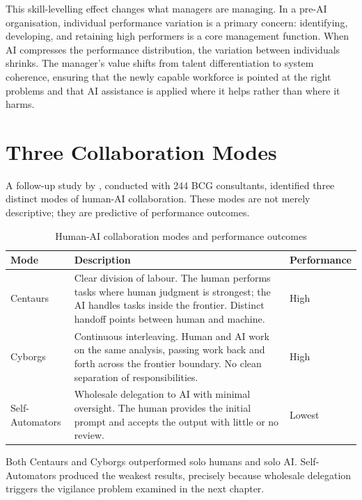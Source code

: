 This skill-levelling effect changes what managers are managing. In a pre-AI organisation, individual performance variation is a primary concern: identifying, developing, and retaining high performers is a core management function. When AI compresses the performance distribution, the variation between individuals shrinks. The manager's value shifts from talent differentiation to system coherence, ensuring that the newly capable workforce is pointed at the right problems and that AI assistance is applied where it helps rather than where it harms.

\section{Three Collaboration Modes}

A follow-up study by \textcite{Randazzo2024}, conducted with 244 BCG consultants, identified three distinct modes of human-AI collaboration. These modes are not merely descriptive; they are predictive of performance outcomes.

\begin{table}[h]
\centering
\caption{Human-AI collaboration modes and performance outcomes}
\label{tab:collaboration-modes}
\begin{tabularx}{\textwidth}{l L{5cm} X}
\toprule
\textbf{Mode} & \textbf{Description} & \textbf{Performance} \\
\midrule
Centaurs & Clear division of labour. The human performs tasks where human judgment is strongest; the AI handles tasks inside the frontier. Distinct handoff points between human and machine. & High \\
\addlinespace
Cyborgs & Continuous interleaving. Human and AI work on the same analysis, passing work back and forth across the frontier boundary. No clean separation of responsibilities. & High \\
\addlinespace
Self-Automators & Wholesale delegation to AI with minimal oversight. The human provides the initial prompt and accepts the output with little or no review. & Lowest \\
\bottomrule
\end{tabularx}
\end{table}

Both Centaurs and Cyborgs outperformed solo humans and solo AI. Self-Automators produced the weakest results, precisely because wholesale delegation triggers the vigilance problem examined in the next chapter.

